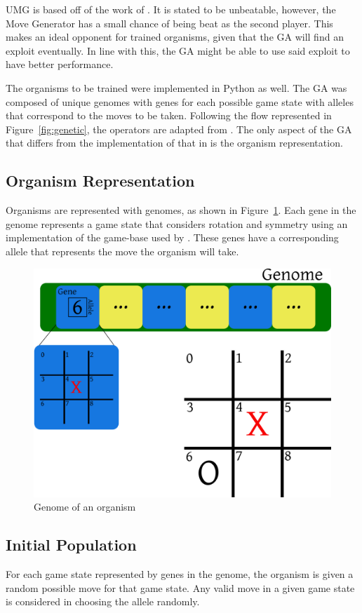 \documentclass{strrespaper-journ}
\begin{document}
		UMG is based off of the work of \textcite{barratRobbiebarratUnbeatableTictactoe2019}.
		It is stated to be unbeatable, however, the Move Generator has a small chance of being beat as the second player.
		This makes an ideal opponent for trained organisms, given that the GA will find an exploit eventually.
		In line with this, the GA might be able to use said exploit to have better performance.

		The organisms to be trained were implemented in Python as well.
		The GA was composed of unique genomes with genes for each possible game state with alleles that correspond to the moves to be taken.
		Following the flow represented in Figure~\ref{fig:genetic}, the operators are adapted from \textcite{bhattSearchNolossStrategies2008}.
		The only aspect of the GA that differs from the implementation of that in \textcite{bhattSearchNolossStrategies2008} is the organism representation.

		\subsection{Organism Representation}
			Organisms are represented with genomes, as shown in Figure~\ref{fig:genome}.
			Each gene in the genome represents a game state that considers rotation and symmetry using an implementation of the game-base used by \textcite{bhattSearchNolossStrategies2008}.
			These genes have a corresponding allele that represents the move the organism will take.
			\begin{figure}[htbp]
				\centering
				\includegraphics[width=0.75\linewidth]{../figures/representation}
				\caption{Genome of an organism}
				\label{fig:genome}
			\end{figure}

		\subsection{Initial Population}
			For each game state represented by genes in the genome, the organism is given a random possible move for that game state.
			Any valid move in a given game state is considered in choosing the allele randomly.
\end{document}
